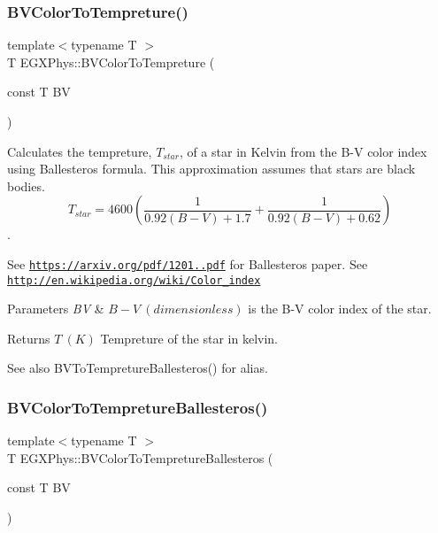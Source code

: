 \subsubsection{\texorpdfstring{B\+V\+Color\+To\+Tempreture()}{BVColorToTempreture()}}
{\footnotesize\ttfamily template$<$typename T $>$ \\
T E\+G\+X\+Phys\+::\+B\+V\+Color\+To\+Tempreture (\begin{DoxyParamCaption}\item[{const T}]{BV }\end{DoxyParamCaption})}



Calculates the tempreture, $T_{star}$, of a star in Kelvin from the B-\/V color index using Ballesteros\textquotesingle{} formula. This approximation assumes that stars are black bodies. \[T_{star}=4600 \left ( \frac{1}{0.92 (B-V)+ 1.7} + \frac{1}{0.92 (B-V) + 0.62} \right )\]. 

See \href{https://arxiv.org/pdf/1201.1809.pdf}{\tt https\+://arxiv.\+org/pdf/1201..\+pdf} for Ballesteros\textquotesingle{} paper. See \href{http://en.wikipedia.org/wiki/Color_index}{\tt http\+://en.\+wikipedia.\+org/wiki/\+Color\+\_\+index}


\begin{DoxyParams}{Parameters}
{\em BV} & $B-V\ (dimensionless)$ is the B-\/V color index of the star. \\
\hline
\end{DoxyParams}
\begin{DoxyReturn}{Returns}
$T\ (K)$ Tempreture of the star in kelvin. 
\end{DoxyReturn}
\begin{DoxySeeAlso}{See also}
B\+V\+To\+Tempreture\+Ballesteros() for alias. 
\end{DoxySeeAlso}
\mbox{\label{group___e_g_x_phys-_astrophysic-_b-_v_color_ga0e553143a3bb121c3ae50ca96c502140}} 
\subsubsection{\texorpdfstring{B\+V\+Color\+To\+Tempreture\+Ballesteros()}{BVColorToTempretureBallesteros()}}
{\footnotesize\ttfamily template$<$typename T $>$ \\
T E\+G\+X\+Phys\+::\+B\+V\+Color\+To\+Tempreture\+Ballesteros (\begin{DoxyParamCaption}\item[{const T}]{BV }\end{DoxyParamCaption})}



